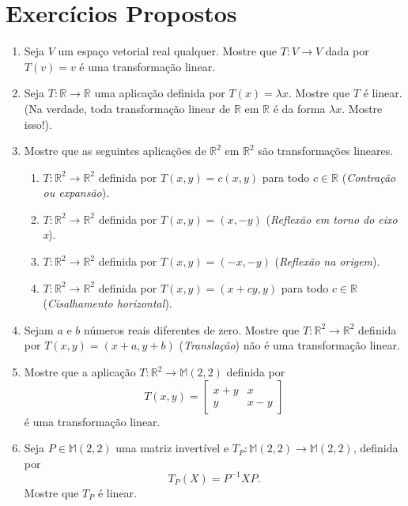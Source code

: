 \section{Exercícios Propostos}
\begin{enumerate}
\item Seja $V$ um espaço vetorial real qualquer. Mostre que $T: V \rightarrow V$   dada por $T(v)=v$ é uma transformação linear.

\item Seja $T: \mathbb{R} \rightarrow  \mathbb{R}$ uma aplicação definida por $T(x)=\lambda x$. Mostre que $T$ é linear. (Na verdade,  toda transformação linear de  $\mathbb{R}$ em $ \mathbb{R}$ é da forma $\lambda x$. Mostre isso!).
\item Mostre que as seguintes aplicações de $\mathbb{R}^2$ em $\mathbb{R}^2$ são transformações lineares.

\begin{enumerate}[label=(\alph*)]
\item  $T: \mathbb{R}^2 \rightarrow \mathbb{R}^2$ definida por $T(x,y)=c(x,y)$ para todo $c \in \mathbb{R}$ (\textit{Contração ou expansão}).
\item  $T: \mathbb{R}^2 \rightarrow \mathbb{R}^2$ definida por $T(x,y)=(x,-y)$  (\textit{Reflexão em torno do eixo x}).
\item  $T: \mathbb{R}^2 \rightarrow \mathbb{R}^2$ definida por $T(x,y)=(-x,-y)$  (\textit{Reflexão na origem}).
\item  $T: \mathbb{R}^2 \rightarrow \mathbb{R}^2$ definida por $T(x,y)=(x+cy,y)$ para todo $c \in \mathbb{R}$ (\textit{Cisalhamento horizontal}).
\end{enumerate}

\item Sejam $a$ e $b$ números reais diferentes de zero.  Mostre que  $T: \mathbb{R}^2 \rightarrow \mathbb{R}^2$ definida por $T(x,y)=(x+a,y+b)$ (\textit{Translação}) não é uma transformação linear.

\item  Mostre que a aplicação $T: \mathbb{R}^2 \rightarrow \mathbb{M}(2, 2)$ definida por $$T(x,y)= \left[ \begin{array}{cc} x+y & x\\ y & x-y \end{array} \right]$$   é uma transformação linear.



\item Seja $P \in \mathbb{M}(2, 2)$ uma matriz invertível e $T_P: \mathbb{M}(2, 2) \rightarrow \mathbb{M}(2, 2)$, definida por $$T_P(X)=P^{-1}XP.$$ Mostre que $T_P$ é linear.


\end{enumerate}
